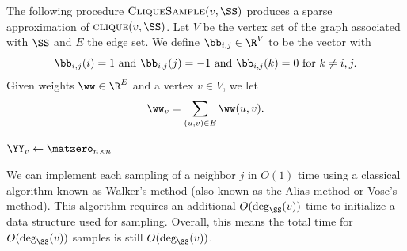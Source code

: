 The following procedure $\vcliqsp{v}{\SS}$ produces a sparse
approximation of $\textsc{clique}(v,\SS)$.
Let $V$ be the vertex set of the graph associated with $\SS$ and $E$
the edge set.
We define $\bb_{i,j} \in \R^V$ to be the vector with
\[
  \bb_{i,j}(i) = 1
  \text{ and }
  \bb_{i,j}(j) = -1
  \text{ and }
  \bb_{i,j}(k) = 0
  \text{ for }
  k \neq i,j.
\]
Given weights $\ww \in \R^E$ and a vertex $v \in V$,
we let
\[
  \ww_v = \sum_{(u,v) \in E} \ww(u,v)
  .
  \]
\begin{algorithm}[H]
\label{alg:cliquesamp}
\caption{$\vcliqsp{v}{\SS}$}
 $\YY_v   \gets  \matzero_{n \times n} $\;
\;
\end{algorithm}
%
\begin{remark}
  We can implement each sampling of a neighbor $j$ in $O(1)$ time
  using a classical algorithm known as Walker's method (also known as the Alias
  method or Vose's method).
  This algorithm requires an additional $O(\deg_{\SS}(v))$ time to
  initialize a data structure used for sampling.
  Overall, this means the total time for $O(\deg_{\SS}(v))$ samples is still $O(\deg_{\SS}(v))$.
\end{remark}

